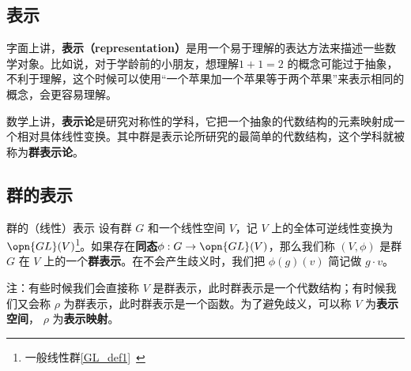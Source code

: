 

\subsection{表示}

字面上讲，\textbf{表示（representation）}是用一个易于理解的表达方法来描述一些数学对象。比如说，对于学龄前的小朋友，想理解$1+1=2$ 的概念可能过于抽象，不利于理解，这个时候可以使用“一个苹果加一个苹果等于两个苹果”来表示相同的概念，会更容易理解。

数学上讲，\textbf{表示论}是研究对称性的学科，它把一个抽象的代数结构的元素映射成一个相对具体线性变换。其中群是表示论所研究的最简单的代数结构，这个学科就被称为\textbf{群表示论}。\cite{GTM222}\cite{维声表示}

\subsection{群的表示}

% 
% 
% 
% 

\begin{definition}{群的（线性）表示}
设有群 $G$ 和一个线性空间 $V$，记 $V$ 上的全体可逆线性变换为 $\opn{GL}(V)$\footnote{一般线性群\autoref{GL_def1}~}。如果存在\textbf{同态}$\phi: G\rightarrow \opn{GL}(V)$，那么我们称 $(V, \phi)$ 是群 $G$ 在 $V$ 上的一个\textbf{群表示}。在不会产生歧义时，我们把 $\phi(g)(v)$ 简记做 $g \cdot v$。
\end{definition}

注：有些时候我们会直接称 $V$ 是群表示，此时群表示是一个代数结构；有时候我们又会称 $\rho$ 为群表示，此时群表示是一个函数。为了避免歧义，可以称 $V$ 为\textbf{表示空间}， $\rho$ 为\textbf{表示映射}。

